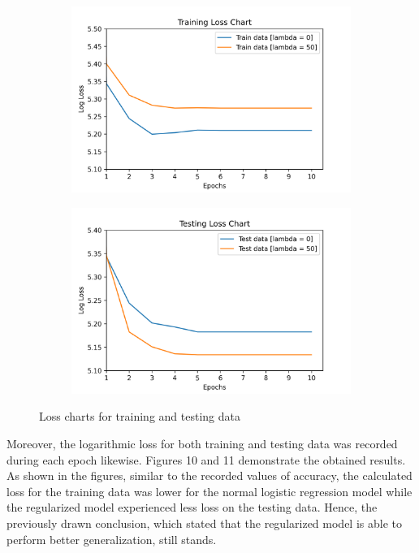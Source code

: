 \documentclass[12pt,a4paper]{article}
\begin{document}
	\vspace{-0.4cm}
	\begin{figure}[H]
		\centering
		\begin{subfigure}[H]{0.45\textwidth}
			\centering
			\includegraphics[width=1.2\textwidth]{Figures/Loss_train}
		\end{subfigure}
	\hfill
		\begin{subfigure}[H]{0.45\textwidth}
			\centering
			\includegraphics[width=1.2\textwidth]{Figures/Loss_test}
		\end{subfigure}
		\vspace{-0.1cm}
		\caption{Loss charts for training and testing data}
	\end{figure}
	
	\vspace{-0.4cm}
	\noindent Moreover, the logarithmic loss for both training and testing data was recorded during each epoch likewise. Figures 10 and 11 demonstrate the obtained results. As shown in the figures, similar to the recorded values of accuracy, the calculated loss for the training data was lower for the normal logistic regression model while the regularized model experienced less loss on the testing data. Hence, the previously drawn conclusion, which stated that the regularized model is able to perform better generalization, still stands.
	
\end{document}
